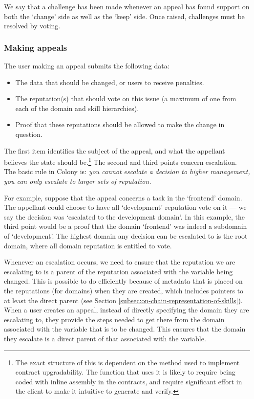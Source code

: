 We say that a challenge has been made whenever an appeal has found support on both the `change' side as well as the `keep' side. Once raised, challenges must be resolved by voting.

\subsubsection{Making appeals}

The user making an appeal submits the following data:

\begin{itemize}
 \item The data that should be changed, or users to receive penalties.
 \item The reputation(s) that should vote on this issue (a maximum of one from each of the domain and skill hierarchies).
 \item Proof that these reputations should be allowed to make the change in question.
\end{itemize}

The first item identifies the subject of the appeal, and what the appellant believes the state should be.\footnote{The exact structure of this is dependent on the method used to implement contract upgradability. The function that uses it is likely to require being coded with inline assembly in the contracts, and require significant effort in the client to make it intuitive to generate and verify.} The second and third points concern escalation. The basic rule in Colony is: \textit{you cannot escalate a decision to higher management, you can only escalate to larger sets of reputation.}

For example, suppose that the appeal concerns a task in the `frontend' domain. The appellant could choose to have all `development' reputation vote on it --- we say the decision was `escalated to the development domain'. In this example, the third point would be a proof that the domain `frontend' was indeed a subdomain of `development'. The highest domain any decision can be escalated to is the root domain, where all domain reputation is entitled to vote.

Whenever an escalation occurs, we need to ensure that the reputation we are escalating to is a parent of the reputation associated with the variable being changed. This is possible to do efficiently because of metadata that is placed on the reputations (for domains) when they are created, which includes pointers to at least the direct parent (see Section \ref{subsec:on-chain-representation-of-skills}). When a user creates an appeal, instead of directly specifying the domain they are escalating to, they provide the steps needed to get there from the domain associated with the variable that is to be changed. This ensures that the domain they escalate is a direct parent of that associated with the variable.


